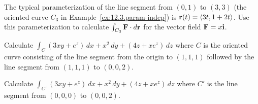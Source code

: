 \begin{activity} \label{A:12.3.3}  
\ba
\item The typical parameterization of the line segment from $(0,1)$ to
  $(3,3)$ (the oriented curve $C_3$ in
  Example~\ref{ex:12.3.param-indep}) is $\mathbf{r}(t) = \langle 3t,1+2t\rangle$. Use this
  parameterization to calculate $\int_{C_3}\mathbf{F}\cdot d\mathbf{r}$ for the
  vector field $\mathbf{F} = x\mathbf{i}$.
\item Calculate $\int_C (3xy+e^z)\, dx + x^2\, dy + (4z+xe^z)\, dz$
  where $C$ is the oriented curve consisting of the line segment from
  the origin to $(1,1,1)$ followed by the line segment from $(1,1,1)$
  to $(0,0,2)$.
\item Calculate $\int_{C'} (3xy+e^z)\, dx + x^2\, dy + (4z+xe^z)\, dz$
  where $C'$ is the line segment from $(0,0,0)$ to $(0,0,2)$.
\ea
\end{activity}
\begin{smallhint}

\end{smallhint}
\begin{bighint}

\end{bighint}
\begin{activitySolution}

\end{activitySolution}
\aftera
